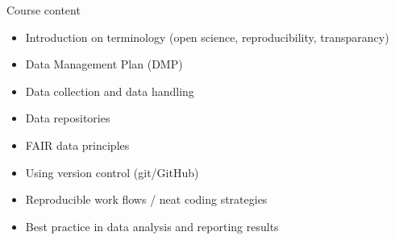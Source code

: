 \documentclass[
  10pt,
  ignorenonframetext,
]{beamer}
\providecommand{\tightlist}{%
  \setlength{\itemsep}{0pt}\setlength{\parskip}{0pt}}
\begin{document}
\begin{frame}
\begin{block}{Course content}
\protect\hypertarget{course-content}{}
\(~\)

\begin{itemize}
\tightlist
\item
  Introduction on terminology (open science, reproducibility,
  transparancy)
\end{itemize}

\vspace{1mm}

\begin{itemize}
\tightlist
\item
  Data Management Plan (DMP)
\end{itemize}

\vspace{1mm}

\begin{itemize}
\tightlist
\item
  Data collection and data handling
\end{itemize}

\vspace{1mm}

\begin{itemize}
\tightlist
\item
  Data repositories
\end{itemize}

\vspace{1mm}

\begin{itemize}
\tightlist
\item
  FAIR data principles
\end{itemize}

\vspace{1mm}

\begin{itemize}
\tightlist
\item
  Using version control (git/GitHub)
\end{itemize}

\vspace{1mm}

\begin{itemize}
\tightlist
\item
  Reproducible work flows / neat coding strategies
\end{itemize}

\vspace{1mm}

\begin{itemize}
\tightlist
\item
  Best practice in data analysis and reporting results
\end{itemize}
\end{block}
\end{frame}
\end{document}
